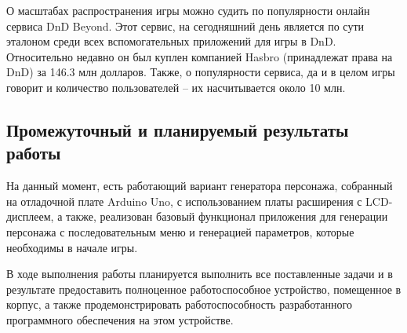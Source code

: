 \documentclass[12pt,a4paper]{article}
\begin{document}
О масштабах распространения игры можно судить по популярности онлайн сервиса DnD Beyond. Этот сервис, на сегодняшний день является по сути эталоном среди всех вспомогательных приложений для игры в DnD. Относительно недавно он был куплен компанией Hasbro (принадлежат права на DnD) за 146.3 млн долларов. Также, о популярности сервиса, да и в целом игры говорит и количество пользователей -- их насчитывается около 10 млн.

\subsection{Промежуточный и планируемый результаты работы}

На данный момент, есть работающий вариант генератора персонажа, собранный на отладочной плате Arduino Uno, с использованием платы расширения с LCD-дисплеем, а также, реализован базовый функционал приложения для генерации персонажа с последовательным меню и генерацией параметров, которые необходимы в начале игры.

В ходе выполнения работы планируется выполнить все поставленные задачи и в результате предоставить полноценное работоспособное устройство, помещенное в корпус, а также продемонстрировать работоспособность разработанного программного обеспечения на этом устройстве.
\end{document}
